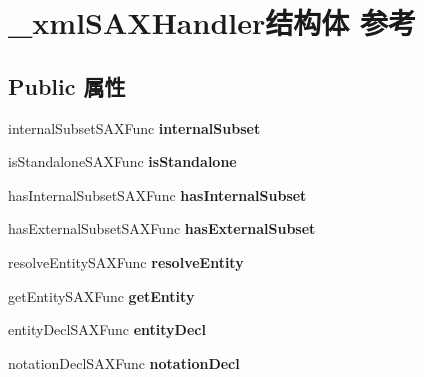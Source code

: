 \hypertarget{struct__xml_s_a_x_handler}{}\section{\+\_\+xml\+S\+A\+X\+Handler结构体 参考}
\label{struct__xml_s_a_x_handler}
\subsection*{Public 属性}
\begin{DoxyCompactItemize}
\item 
\mbox{\label{struct__xml_s_a_x_handler_a7efae3be1f8af0e90820427744c26f48}} 
internal\+Subset\+S\+A\+X\+Func {\bfseries internal\+Subset}
\item 
\mbox{\label{struct__xml_s_a_x_handler_aa5ee8d4a02fd4bde74c3be5dbfdf608e}} 
is\+Standalone\+S\+A\+X\+Func {\bfseries is\+Standalone}
\item 
\mbox{\label{struct__xml_s_a_x_handler_ab28d186ce3e3876ab981cc3b911f616b}} 
has\+Internal\+Subset\+S\+A\+X\+Func {\bfseries has\+Internal\+Subset}
\item 
\mbox{\label{struct__xml_s_a_x_handler_a1a787a6a8c16f1229fe4efd525e93679}} 
has\+External\+Subset\+S\+A\+X\+Func {\bfseries has\+External\+Subset}
\item 
\mbox{\label{struct__xml_s_a_x_handler_ac50c24e61236da8bae7730b8185208b8}} 
resolve\+Entity\+S\+A\+X\+Func {\bfseries resolve\+Entity}
\item 
\mbox{\label{struct__xml_s_a_x_handler_a2e52dd17ed7ee2bc5e85362759dc2cfa}} 
get\+Entity\+S\+A\+X\+Func {\bfseries get\+Entity}
\item 
\mbox{\label{struct__xml_s_a_x_handler_ae7be01c36f39914f1ce8373b02670ea3}} 
entity\+Decl\+S\+A\+X\+Func {\bfseries entity\+Decl}
\item 
\mbox{\label{struct__xml_s_a_x_handler_ab41d080edc929fc5e39fee869ae46837}} 
notation\+Decl\+S\+A\+X\+Func {\bfseries notation\+Decl}

\end{DoxyCompactItemize}
